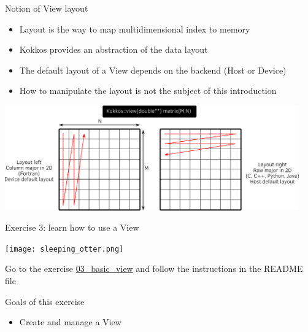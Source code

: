 \documentclass[aspectratio=169]{beamer}
\begin{document}

\begin{frame}{Notion of View layout}
    \begin{itemize}
        \item Layout is the way to map multidimensional index to memory
        \item Kokkos provides an abstraction of the data layout
        \item The default layout of a View depends on the backend (Host or Device)
        \item How to manipulate the layout is not the subject of this introduction
    \end{itemize}
    \begin{center}
        \includegraphics[width=0.95\textwidth]{layout_right_left.png}
    \end{center}
\end{frame}


\begin{frame}{Exercise 3: learn how to use a View}
    \begin{center}
        \texttt{[image: sleeping\_otter.png]}
    \end{center}

    Go to the exercise \href{https://github.com/CExA-project/cexa-kokkos-tutorials/tree/main/exercises/03_basic_view}{03\_basic\_view} and follow the instructions in the README file

    \begin{block}{Goals of this exercise}
        \begin{itemize}
            \item Create and manage a View
        \end{itemize}
    \end{block}
\end{frame}

\end{document}
